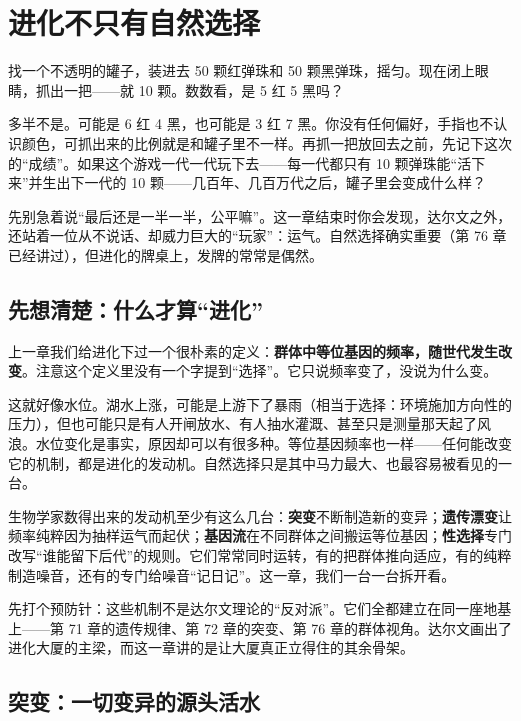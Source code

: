 \chapter{进化不只有自然选择}

\begin{kaichang}
找一个不透明的罐子，装进去 50 颗红弹珠和 50 颗黑弹珠，摇匀。现在闭上眼睛，抓出一把——就 10 颗。数数看，是 5 红 5 黑吗？

多半不是。可能是 6 红 4 黑，也可能是 3 红 7 黑。你没有任何偏好，手指也不认识颜色，可抓出来的比例就是和罐子里不一样。再抓一把放回去之前，先记下这次的“成绩”。如果这个游戏一代一代玩下去——每一代都只有 10 颗弹珠能“活下来”并生出下一代的 10 颗——几百年、几百万代之后，罐子里会变成什么样？

先别急着说“最后还是一半一半，公平嘛”。这一章结束时你会发现，达尔文之外，还站着一位从不说话、却威力巨大的“玩家”：运气。自然选择确实重要（第 76 章已经讲过），但进化的牌桌上，发牌的常常是偶然。
\end{kaichang}

\section{先想清楚：什么才算“进化”}

上一章我们给进化下过一个很朴素的定义：\textbf{群体中等位基因的频率，随世代发生改变}。注意这个定义里没有一个字提到“选择”。它只说频率变了，没说为什么变。

这就好像水位。湖水上涨，可能是上游下了暴雨（相当于选择：环境施加方向性的压力），但也可能只是有人开闸放水、有人抽水灌溉、甚至只是测量那天起了风浪。水位变化是事实，原因却可以有很多种。等位基因频率也一样——任何能改变它的机制，都是进化的发动机。自然选择只是其中马力最大、也最容易被看见的一台。

生物学家数得出来的发动机至少有这么几台：\textbf{突变}不断制造新的变异；\textbf{遗传漂变}让频率纯粹因为抽样运气而起伏；\textbf{基因流}在不同群体之间搬运等位基因；\textbf{性选择}专门改写“谁能留下后代”的规则。它们常常同时运转，有的把群体推向适应，有的纯粹制造噪音，还有的专门给噪音“记日记”。这一章，我们一台一台拆开看。

先打个预防针：这些机制不是达尔文理论的“反对派”。它们全都建立在同一座地基上——第 71 章的遗传规律、第 72 章的突变、第 76 章的群体视角。达尔文画出了进化大厦的主梁，而这一章讲的是让大厦真正立得住的其余骨架。

\section{突变：一切变异的源头活水}

